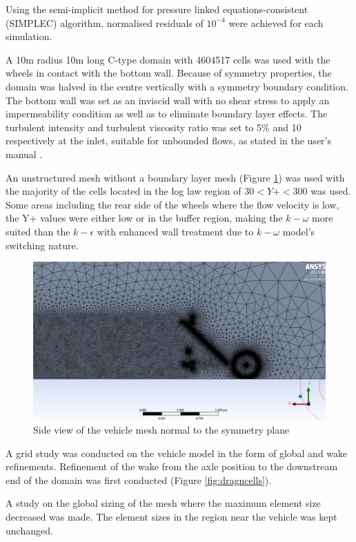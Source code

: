 Using the semi-implicit method for pressure linked equations-consistent (SIMPLEC) algorithm, normalised residuals of $10^{-4}$ were achieved for each simulation.

A 10m radius 10m long C-type domain with 4604517 cells was used with the wheels in contact with the bottom wall. Because of symmetry properties, the domain was halved in the centre vertically with a symmetry boundary condition. The bottom wall was set as an inviscid wall with no shear stress to apply an impermeability condition as well as to eliminate boundary layer effects. The turbulent intensity and turbulent viscosity ratio was set to 5\% and 10 respectively at the inlet, suitable for unbounded flows, as stated in the user’s manual
 \cite{usrguide}.

An unstructured mesh without a boundary layer mesh (Figure \ref{fig:vehiclesidemesh}) was used with the majority of the cells located in the log law region of $30<Y+<300$ was used. Some areas including the rear side of the wheels where the flow velocity is low, the Y+ values were either low or in the buffer region, making the $k-\omega$ more suited than the $k-\epsilon$ with enhanced wall treatment due to $k-\omega$ model's switching nature.

\begin{figure}[!htbp]
    \centering
    \includegraphics{images/part10.1/vehiclemesh.jpg}
    \caption{Side view of the vehicle mesh normal to the symmetry plane}
    \label{fig:vehiclesidemesh}
\end{figure}

A grid study was conducted on the vehicle model in the form of global and wake refinements.
Refinement of the wake from the axle position to the downstream end of the domain was first conducted (Figure \ref{fig:dragncells}). 


A study on the global sizing of the mesh where the maximum element size decreased was made. The element sizes in the region near the vehicle was kept unchanged.

